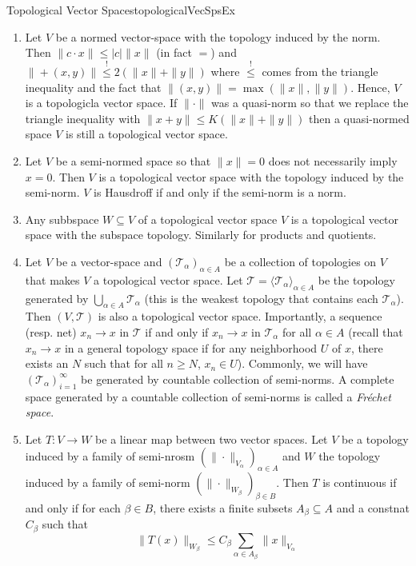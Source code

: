 \documentclass[oneside]{book}
\newcommand{\CT}{\mathcal{T}}
\newcommand{\sse}{\subseteq}
\begin{document}
\begin{example}{Topological Vector Spaces}{topologicalVecSpsEx}
	\begin{enumerate}
		\item Let $V$ be a normed vector-space with the topology induced by the norm. Then $\|c\cdot x\| \le
			|c|\|x\|$ (in fact $=$) and
			$\|+(x,y)\| \overset{!}{\le} 2(\|x\| + \|y\|)$ where $\overset{!}{\le}$ comes from the triangle inequality
			and the fact that $\|(x,y)\| = \max(\|x\|, \|y\|)$. Hence, $V$ is a topologicla vector space. If $\|\cdot\|$
			was a quasi-norm so that we replace the triangle inequality with $\|x+y\| \le K(\|x\| + \|y\|)$ then
			a quasi-normed space $V$ is still a topological vector space.
		\item Let $V$ be a semi-normed space so that $\|x\| = 0$ does not necessarily imply $x = 0$. Then $V$ is
			a topological vector space with the topology induced by the semi-norm. $V$ is Hausdroff if and only if the semi-norm is a norm.
		\item Any subbspace $W \sse V$ of a topological vector space $V$ is a topological vector space with the subspace
			topology. Similarly for products and quotients.
		\item Let $V$ be a vector-space and $(\CT_\alpha)_{\alpha\in A}$ be a collection of topologies on $V$ that makes $V$
			a topological vector space. Let $\CT = \langle \CT_\alpha\rangle_{\alpha \in A}$ be the topology generated
			by $\bigcup_{\alpha \in A} \CT_\alpha$ (this is the weakest topology that contains each $\CT_\alpha$). Then
			$(V, \CT)$ is also a topological vector space. Importantly, a sequence (resp. net) $x_n \to x$ in $\CT$ if and only
			if $x_n \to x$ in $\CT_\alpha$ for all $\alpha \in A$ (recall that $x_n \to x$ in a general topology space
			if for any neighborhood $U$ of $x$, there exists an $N$ such that for all $n \ge N$, $x_n \in U$). Commonly,
			we will have $(\CT_\alpha)_{i=1}^\infty$ be generated by countable collection of semi-norms.
			A complete space generated by a countable collection of semi-norms is called a \emph{Fr\'echet
			space}.
		\item Let $T: V \to W$ be a linear map between two vector spaces. Let $V$ be a topology induced by
			a family of semi-nrosm $(\|\cdot\|_{V_\alpha})_{\alpha \in A}$
			and $W$ the topology induced by a family of semi-norm $(\|\cdot\|_{W_\beta})_{\beta \in B}$.
			Then $T$ is continuous if and only if for each $\beta \in B$, there exists a finite
			subsets $A_\beta \sse A$ and a constnat $C_\beta$ such that
			\[
				\|T(x)\|_{W_\beta} \le C_\beta \sum_{\alpha\in A_\beta} \|x\|_{V_\alpha}
\]
\end{enumerate}
\end{example}
\end{document}
